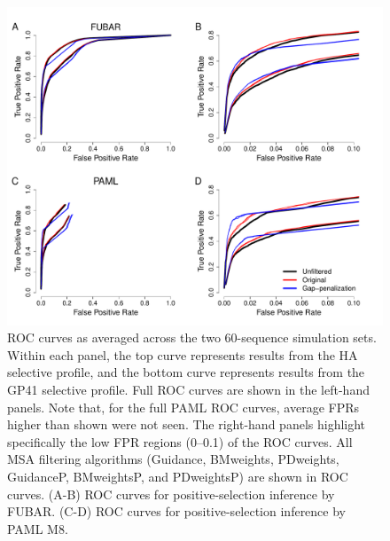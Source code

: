 \documentclass[11pt]{article}
\begin{document}
\begin{figure}[H]
\centerline{\includegraphics[width=6in]{Figures/ROC_prk.pdf}}
\caption{\label{roc} ROC curves as averaged across the two 60-sequence simulation sets. Within each panel, the top curve represents results from the HA selective profile, and the bottom curve represents results from the GP41 selective profile. Full ROC curves are shown in the left-hand panels. Note that, for the full PAML ROC curves, average FPRs higher than shown were not seen. The right-hand panels highlight specifically the low FPR regions (0--0.1) of the ROC curves. All MSA filtering algorithms (Guidance, BMweights, PDweights, GuidanceP, BMweightsP, and PDweightsP) are shown in ROC curves. (A-B) ROC curves for positive-selection inference by FUBAR. (C-D) ROC curves for positive-selection inference by PAML M8.}
\end{figure}
\end{document}
